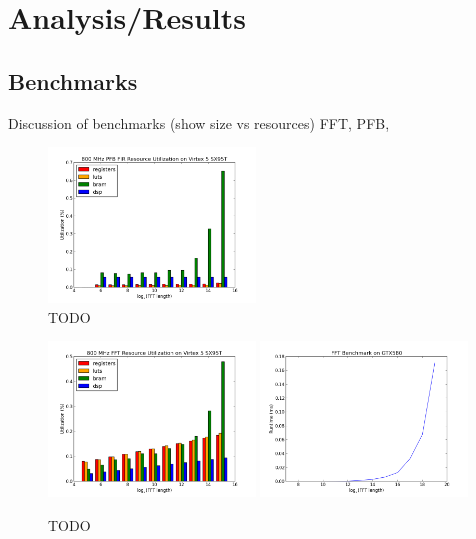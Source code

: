 \chapter{Analysis/Results}

\section{Benchmarks}
Discussion of benchmarks (show size vs resources) FFT, PFB,

\begin{figure}[ht!]
  \centering
    \includegraphics[width=0.49\textwidth]{Images/C6/pfb_bench.png}
  \caption{TODO}
  \label{fig: C6/pfb_bench.png}
\end{figure}

\begin{figure}[ht!]
  \centering
    \includegraphics[width=0.49\textwidth]{Images/C6/fft_bench.png}
    \includegraphics[width=0.49\textwidth]{Images/C6/fft_gpu_bench.png}
  \caption{TODO}
  \label{fig: C6/fft_bench.png}
\end{figure}

